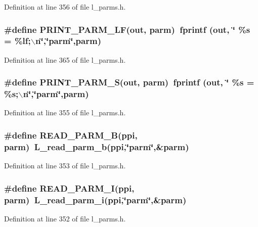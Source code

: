 Definition at line 356 of file l\_\-parms.h.
\subsubsection{\setlength{\rightskip}{0pt plus 5cm}\#define PRINT\_\-PARM\_\-LF(out, parm)~fprintf (out, \char`\"{}    \%s = \%lf;$\backslash$n\char`\"{},\char`\"{}parm\char`\"{},parm)}\label{l__parms_8h_5efe39e8ee10dee633d64e14757a5e9f}




Definition at line 365 of file l\_\-parms.h.
\subsubsection{\setlength{\rightskip}{0pt plus 5cm}\#define PRINT\_\-PARM\_\-S(out, parm)~fprintf (out, \char`\"{}    \%s = \%s;$\backslash$n\char`\"{},\char`\"{}parm\char`\"{},parm)}\label{l__parms_8h_7d0a98b425e7026ef0a897dd838653a1}




Definition at line 355 of file l\_\-parms.h.
\subsubsection{\setlength{\rightskip}{0pt plus 5cm}\#define READ\_\-PARM\_\-B(ppi, parm)~L\_\-read\_\-parm\_\-b(ppi,\char`\"{}parm\char`\"{},\&parm)}\label{l__parms_8h_e622b3a3ba8e82549041d831e681dcb6}




Definition at line 353 of file l\_\-parms.h.
\subsubsection{\setlength{\rightskip}{0pt plus 5cm}\#define READ\_\-PARM\_\-I(ppi, parm)~L\_\-read\_\-parm\_\-i(ppi,\char`\"{}parm\char`\"{},\&parm)}\label{l__parms_8h_fa6756eafe2e27525d05be201c7a2b21}




Definition at line 352 of file l\_\-parms.h.
